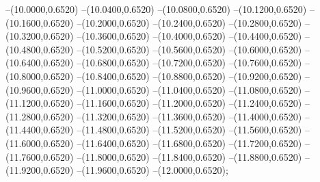 {	--(10.0000,0.6520)
	--(10.0400,0.6520)
	--(10.0800,0.6520)
	--(10.1200,0.6520)
	--(10.1600,0.6520)
	--(10.2000,0.6520)
	--(10.2400,0.6520)
	--(10.2800,0.6520)
	--(10.3200,0.6520)
	--(10.3600,0.6520)
	--(10.4000,0.6520)
	--(10.4400,0.6520)
	--(10.4800,0.6520)
	--(10.5200,0.6520)
	--(10.5600,0.6520)
	--(10.6000,0.6520)
	--(10.6400,0.6520)
	--(10.6800,0.6520)
	--(10.7200,0.6520)
	--(10.7600,0.6520)
	--(10.8000,0.6520)
	--(10.8400,0.6520)
	--(10.8800,0.6520)
	--(10.9200,0.6520)
	--(10.9600,0.6520)
	--(11.0000,0.6520)
	--(11.0400,0.6520)
	--(11.0800,0.6520)
	--(11.1200,0.6520)
	--(11.1600,0.6520)
	--(11.2000,0.6520)
	--(11.2400,0.6520)
	--(11.2800,0.6520)
	--(11.3200,0.6520)
	--(11.3600,0.6520)
	--(11.4000,0.6520)
	--(11.4400,0.6520)
	--(11.4800,0.6520)
	--(11.5200,0.6520)
	--(11.5600,0.6520)
	--(11.6000,0.6520)
	--(11.6400,0.6520)
	--(11.6800,0.6520)
	--(11.7200,0.6520)
	--(11.7600,0.6520)
	--(11.8000,0.6520)
	--(11.8400,0.6520)
	--(11.8800,0.6520)
	--(11.9200,0.6520)
	--(11.9600,0.6520)
	--(12.0000,0.6520);
}

